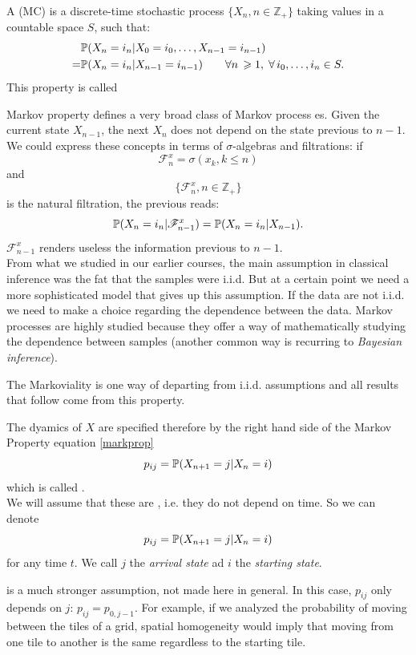 \documentclass{article}
\begin{document}
\begin{definition}
    A  (MC) is a discrete-time stochastic process $\{X_n,n\in\mathbb{Z}_+\}$ taking values in a countable space $S$, such that:
    \begin{align}\label{markprop}
        &\mathbb{P}(X_n=i_n|X_0=i_0,\ldots,X_{n-1}=i_{n-1})\\
        =&\mathbb{P}(X_n=i_n|X_{n-1}=i_{n-1})\qquad\forall n\,\geqslant1,\;\forall\,i_0,\ldots,i_n \in S.
    \end{align}
    This property is called 
\end{definition}
Markov property defines a very broad class of Markov process es. Given the current state $X_{n-1}$, the next $X_n$ does not depend on the state previous to $n-1$. We could express these concepts in terms of $\sigma$-algebras and filtrations: if
\[
\mathscr{F}^x_n=\sigma(x_k, k\leqslant n)
\]
and 
\[
\{\mathscr{F}^x_n,n\in \mathbb{Z}_+\}
\]
is the natural filtration, the previous reads:
\[
\mathbb{P}(X_n=i_n|\mathscr{F}^x_{n-1})=\mathbb{P}(X_n=i_n|X_{n-1}).
\]
$\mathscr{F}^x_{n-1}$ renders useless the information previous to $n-1$.\bigskip\\
From what we studied in our earlier courses, the main assumption in classical inference was the fat that the samples were i.i.d. But at a certain point we need a more sophisticated model that gives up this assumption. If the data are not i.i.d. we need to make a choice regarding the dependence between the data. Markov processes are highly studied because they offer a way of mathematically studying the dependence between samples (another common way is recurring to \textit{Bayesian inference}). 
\begin{remark}
    The Markoviality is one way of departing from i.i.d. assumptions and all results that follow come from this property.
\end{remark}
The dyamics of $X$ are specified therefore by the right hand side of the Markov Property equation \ref{markprop}
\[p_{ij}=\mathbb{P}(X_{n+1}=j|X_n=i)\]
which is called .\\
We will assume that these are , i.e. they do not depend on time. So we can denote
\[p_{ij}=\mathbb{P}(X_{n+1}=j|X_n=i) \]
for any time $t$. We call $j$ the \textit{arrival state} ad $i$ the \textit{starting state}.
\begin{remark}
     is a much stronger assumption, not made here in general. In this case, $p_{ij}$ only depends on $j$: $p_{ij}=p_{0, j-1}$. For example, if we analyzed the probability of moving between the tiles of a grid, spatial homogeneity would imply that moving from one tile to another is the same regardless to the starting tile.
\end{remark}
\end{document}
